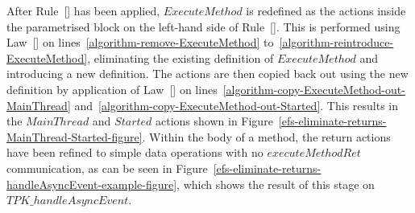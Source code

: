 After Rule~[] has been applied,
$ExecuteMethod$ is redefined as the actions inside the parametrised
block on the left-hand side of
Rule~[].
This is performed using Law~[] on
lines~\ref{algorithm-remove-ExecuteMethod}
to~\ref{algorithm-reintroduce-ExecuteMethod}, eliminating the existing
definition of $ExecuteMethod$ and introducing a new definition.
The actions are then copied back out using the new definition by
application of Law~[] on
lines~\ref{algorithm-copy-ExecuteMethod-out-MainThread}
and~\ref{algorithm-copy-ExecuteMethod-out-Started}.
This results in the $MainThread$ and $Started$ actions shown in
Figure~\ref{efs-eliminate-returns-MainThread-Started-figure}.
Within the body of a method, the return actions have been refined to
simple data operations with no $executeMethodRet$ communication, as
can be seen in
Figure~\ref{efs-eliminate-returns-handleAsyncEvent-example-figure},
which shows the result of this stage on $TPK\_handleAsyncEvent$.

